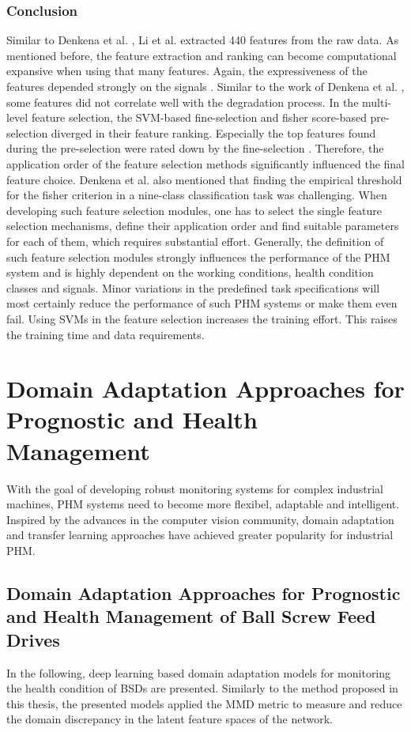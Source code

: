 \subsubsection{Conclusion}
Similar to Denkena et al. \cite{Denkena2021}, Li et al. \cite{LiPin2018} extracted 440 features from the raw data. As mentioned before, the feature extraction and ranking can become computational expansive when using that many features. Again, the expressiveness of the features depended strongly on the signals \cite{LiPin2018}. Similar to the work of Denkena et al. \cite{Denkena2021}, some features did not correlate well with the degradation process. In the multi-level feature selection, the SVM-based fine-selection and fisher score-based pre-selection diverged in their feature ranking. Especially the top features found during the pre-selection were rated down by the fine-selection \cite{LiPin2018}. Therefore, the application order of the feature selection methods significantly influenced the final feature choice. Denkena et al. \cite{Denkena2021} also mentioned that finding the empirical threshold for the fisher criterion in a nine-class classification task was challenging. When developing such feature selection modules, one has to select the single feature selection mechanisms, define their application order and find suitable parameters for each of them, which requires substantial effort. Generally, the definition of such feature selection modules strongly influences the performance of the PHM system and is highly dependent on the working conditions, health condition classes and signals. Minor variations in the predefined task specifications will most certainly reduce the performance of such PHM systems or make them even fail. Using SVMs in the feature selection increases the training effort. This raises the training time and data requirements.


\section{Domain Adaptation Approaches for Prognostic and Health Management} \label{sec:domain_adaption_approach}
With the goal of developing robust monitoring systems for complex industrial machines, PHM systems need to become more flexibel, adaptable and intelligent. Inspired by the advances in the computer vision community, domain adaptation and transfer learning approaches have achieved greater popularity for industrial PHM. 

\subsection{Domain Adaptation Approaches for Prognostic and Health Management of Ball Screw Feed Drives}
In the following, deep learning based domain adaptation models for monitoring the health condition of BSDs are presented. Similarly to the method proposed in this thesis, the presented models applied the MMD metric to measure and reduce the domain discrepancy in the latent feature spaces of the network.


